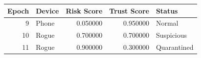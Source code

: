 \begin{tabular}{rlrrl}
\toprule
Epoch & Device & Risk Score & Trust Score & Status \\
\midrule
9 & Phone & 0.050000 & 0.950000 & Normal \\
10 & Rogue & 0.700000 & 0.700000 & Suspicious \\
11 & Rogue & 0.900000 & 0.300000 & Quarantined \\
\bottomrule
\end{tabular}
